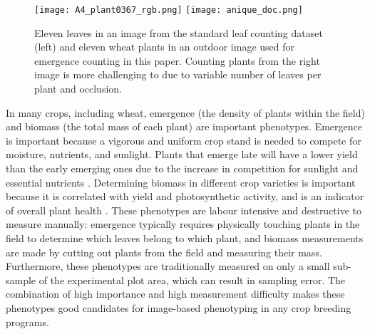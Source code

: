 \documentclass[10pt,twocolumn,letterpaper]{article}
\begin{document}
\begin{figure}[t!]
\centering
	\texttt{[image: A4\_plant0367\_rgb.png]}
	\texttt{[image: anique\_doc.png]}
    \caption{Eleven leaves in an image from the standard leaf counting dataset \cite{dataset-cvppp2017-03} (left) and eleven wheat plants in an outdoor image used for emergence counting in this paper. Counting plants from the right image is more challenging to due to variable number of leaves per plant and  occlusion.}
    \label{fig:emergence_difficult}
\end{figure}

In many crops, including wheat, emergence (the density of plants within the field) and biomass (the total mass of each plant) are important phenotypes. Emergence is important because a vigorous and uniform crop stand is needed to compete for moisture, nutrients, and sunlight. Plants that emerge late will have a lower yield than the early emerging ones due to the increase in competition for sunlight and essential nutrients \cite{lawles2012}. Determining biomass in different crop varieties is important because it is correlated with yield \cite{soriano2017}
and photosynthetic activity, and is an indicator of overall plant health \cite{dai2016}.
These phenotypes are labour intensive and destructive to measure manually: emergence typically requires physically touching plants in the field to determine which leaves belong to which plant, and biomass measurements are made by cutting out plants from the field and measuring their mass. Furthermore, these phenotypes are traditionally measured on only a small sub-sample of the experimental plot area, which can result in sampling error. The combination of high importance and high measurement difficulty makes these phenotypes good candidates for image-based phenotyping in any crop breeding programs.
\end{document}
